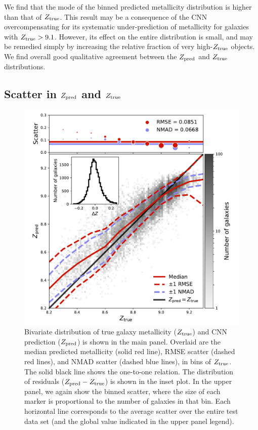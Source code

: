 \documentclass[fleqn,usenatbib]{mnras}
\begin{document}
We find that the mode of the binned predicted metallicity distribution is higher than that of $Z_{\rm true}$. This result may be a consequence of the CNN overcompensating for its systematic under-prediction of metallicity for galaxies with $Z_{\rm true} > 9.1$. However, its effect on the entire distribution is small, and may be remedied simply by increasing the relative fraction of very high-$Z_{\rm true}$ objects. We find overall good qualitative agreement between the $Z_{\rm pred}$ and $Z_{\rm true}$ distributions.

\subsection{Scatter in $Z_{\rm pred}$ and $Z_{\rm true}$}
\begin{figure}
	\includegraphics[width=\columnwidth]{02-prediction_summary.pdf}
	\caption{\label{fig:predicting-metallicity}
		Bivariate distribution of true galaxy metallicity ($Z_{\rm true}$) and CNN prediction ($Z_{\rm pred}$) is shown in the main panel. Overlaid are the median predicted metallicity (solid red line), RMSE scatter (dashed red lines), and NMAD scatter (dashed blue lines), in bins of $Z_{\rm true}$. The solid black line shows the one-to-one relation. The distribution of residuals ($Z_{\rm pred} - Z_{\rm true}$) is shown in the inset plot. In the upper panel, we again show the binned scatter, where the size of each marker is proportional to the number of galaxies in that bin. Each horizontal line corresponds to the average scatter over the entire test data set (and the global value indicated in the upper panel legend).}
\end{figure}
\end{document}
